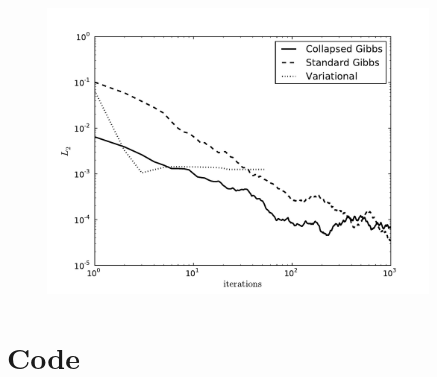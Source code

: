 \documentclass[11pt]{article}
\newcommand{\figlabel}[1]{\label{fig:#1}}
\begin{document}
\begin{figure}[htbp]
    \centering
    \includegraphics[width=0.9\textwidth]{../results.pdf}
    \caption{\figlabel{results}}
\end{figure}

\newpage

\section{Code} \label{sect:code}


\end{document}
